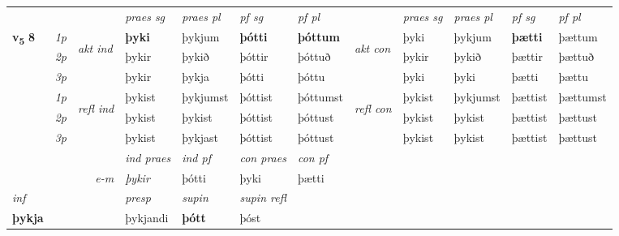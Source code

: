 \begin{longtable}[l]{X>{\footnotesize\itshape}llXXXXlXXXX}
 & &   & \textit{praes sg}  & \textit{praes pl}    & \textit{ pf sg} & \textit{pf pl} & & \textit{praes sg}  & \textit{praes pl}    & \textit{pf sg} & \textit{pf pl }  \\ \cmidrule{4-7} \cmidrule{9-12}
 \multirow{2}{*}{{{\textbf{v{\textsubscript{5}}} \Large{\textbf{8}}}}}  & 1p & \multirow{3}{*}{\begin{turn}{90}\textit{akt ind}\end{turn}} & \textbf{þyki} & þykjum & \textbf{þótti} & \textbf{þóttum} & \multirow{3}{*}{\begin{turn}{90}\textit{akt con}\end{turn}} &þyki & þykjum & \textbf{þætti} & þættum\\*
 & 2p &  &  þykir  & þykið & þóttir & þóttuð & & þykir & þykið & þættir & þættuð \\*
 & 3p &  & þykir & þykja & þótti & þóttu & & þyki & þyki& þætti & þættu \\*
\cmidrule{4-7} \cmidrule{9-12}
 & 1p & \multirow{3}{*}{\begin{turn}{90}\textit{refl ind}\end{turn}}  & þykist & þykjumst & þóttist & þóttumst & \multirow{3}{*}{\begin{turn}{90}\textit{refl con}\end{turn}}  &þykist & þykjumst & þættist & þættumst \\*
 & 2p &  & þykist & þykist & þóttist & þóttust & &þykist & þykist & þættist & þættust \\*
 & 3p  & & þykist & þykjast & þóttist & þóttust & & þykist & þykist& þættist & þættust \\*
\cmidrule{4-7} \cmidrule{9-12}

   && &  \textit{ind praes} & \textit{ind pf} & \textit{con praes} & \textit{con pf} \\*
\multicolumn{3}{r}{\textit{e-m}} & þykir & þótti & þyki & þætti \\*

\cmidrule{4-7}
   {\textit{inf}} & &     & \textit{presp} & \textit{supin} & \textit{supin refl}  \\*
  {\textbf{þykja}} & &     & þykjandi &  \textbf{þótt} & þóst  \\*

\midrule


\end{longtable}
